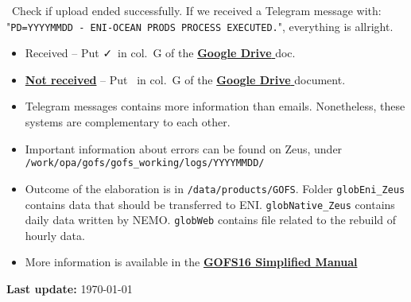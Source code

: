 \documentclass[twocolumn,8pt]{article}
\begin{document}
\begin{mdframed}[frametitle=(E)\ -- Around 11.50 am]

\faSend\ Check if upload ended successfully. If we received a Telegram message with: "\texttt{PD=YYYYMMDD - ENI-OCEAN PRODS PROCESS EXECUTED.}", everything is allright.

\begin{itemize}\itemsep0pt
    \item[{\textcolor{ForestGreen}{\faCheckCircle}}] Received -- Put \faCheck\ in col.\ G of the \href{https://docs.google.com/spreadsheets/d/1XrbzNdr-K6jtwD-tTdRAlaO6S9hy3aSgxQ-OCmYEfL0/edit#gid=1550543264}{\textbf{Google Drive \faExternalLink}} doc. 
    
    \item[{\textcolor{Red}{\faTimesCircle}}] \ul{\textbf{Not received}} -- Put \faTimes\ in col.\ G of the \href{https://docs.google.com/spreadsheets/d/1XrbzNdr-K6jtwD-tTdRAlaO6S9hy3aSgxQ-OCmYEfL0/edit#gid=1550543264}{\textbf{Google Drive \faExternalLink}} document. 
\end{itemize}

\end{mdframed} 

\vfill

\begin{mdframed}[frametitle=Final remarks]
\begin{itemize}\itemsep0pt
    \item Telegram messages contains more information than emails. Nonetheless, these systems are complementary to each other.
    
    \item Important information about errors can be found on Zeus, under \texttt{/work/opa/gofs/gofs\_working/logs/YYYYMMDD/}
    
    \item Outcome of the elaboration is in \texttt{/data/products/GOFS}. Folder \texttt{globEni\_Zeus} contains data that should be transferred to ENI. \texttt{globNative\_Zeus} contains daily data written by NEMO. \texttt{globWeb} contains file related to the rebuild of hourly data.
    
    \item More information is available in the  \href{https://docs.google.com/presentation/d/1GtyfHDRA8M8fqbOj-mrj2zuq521KK_PiMLw-3JQ7jYQ/edit?usp=sharing}{\textbf{GOFS16 Simplified Manual \faExternalLink}}
\end{itemize}
\end{mdframed} 

{\hfill\footnotesize\textbf{Last update:} \today}
\end{document}
